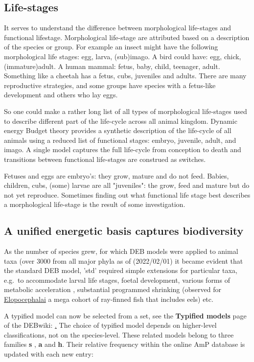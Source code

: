 
\subsection{Life-stages}

It serves to understand the difference between morphological life-stages and functional lifestage. Morphological life-stage are attributed based on a description of the species or group.
For example an insect might have the following morphological life stages: egg, larva, (sub)imago. 
A bird could have: egg, chick, (immature)adult. 
A human mammal: fetus, baby, child, teenager, adult. 
Something like a cheetah has a fetus, cubs, juveniles and adults. 
There are many reproductive strategies, and some groups have species with a fetus-like development and others who lay eggs. 

So one could make a rather long list of all types of morphological life-stages used to describe different part of the life-cycle across all animal kingdom.
Dynamic energy Budget theory provides a synthetic description of the life-cycle of all animals using a reduced list of functional stages: embryo, juvenile, adult, and imago.
A single model captures the full life-cycle from conception to death and transitions between functional life-stages are construed as switches.

Fetuses and eggs are embryo's: they grow, mature and do not feed. 
Babies, children, cubs, (some) larvae are all "juveniles": the grow, feed and mature but do not yet reproduce.
Sometimes finding out what functional life stage best describes a morphological life-stage is the result of some investigation.

\subsection{A unified energetic basis captures biodiversity}

As the number of species grew, for which DEB models were applied to animal taxa (over 3000 from all major phyla as of (2022/02/01) it became evident that the standard DEB model, 'std' required simple extensions for particular taxa, e.g.\ to accommodate larval life stages, foetal development, various forms of metabolic acceleration \cite{Kooy2014}, substantial programmed shrinking (observed for \href{https://fishtreeoflife.org/taxonomy/megacohort/Elopocephalai/}{Elopocephalai} a mega cohort of ray-finned fish that includes eels)  etc.

A typified model can now be selected from a set, see the \textbf{Typified models} page of the DEBwiki: \href{http://www.debtheory.org/wiki/index.php?title=Typified_models}. 
The choice of typified model depends on higher-level classifications, not on the species-level. 
These related models belong to three families \textbf{s} , \textbf{a} and \textbf{h}. 
Their relative frequency within the online AmP database is updated with each new entry: 

